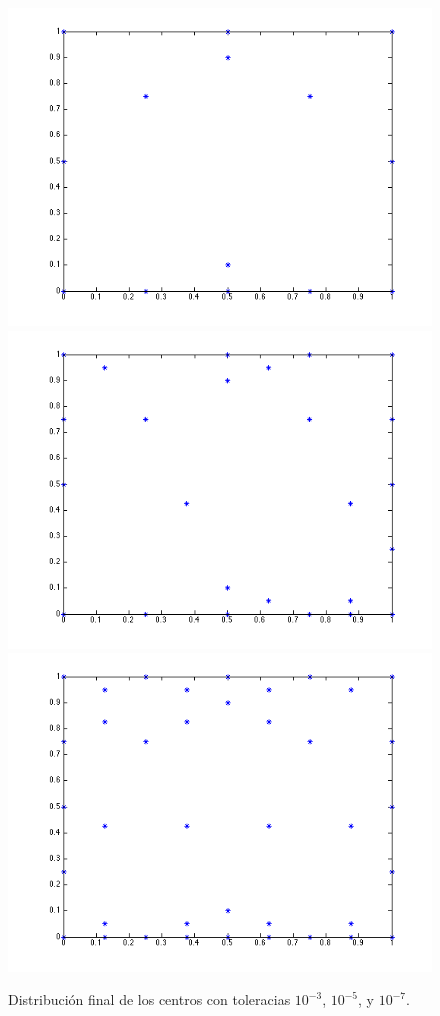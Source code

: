 \documentclass[11pt,a4paper]{article}
\begin{document}
\begin{figure}[H]
\begin{center}
\includegraphics[scale=.4]{edp1_tol1.png}
\includegraphics[scale=.4]{edp1_tol2.png}
\linebreak
\includegraphics[scale=.4]{edp1_tol3.png}
\caption{Distribución final de los  centros  con toleracias $10^{-3}$, $10^{-5}$, y $10^{-7}$.}
\end{center}
\end{figure}
\end{document}
